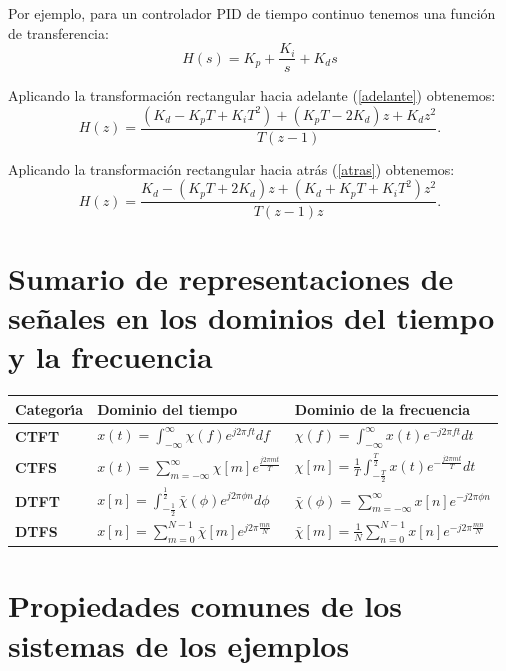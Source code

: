 Por ejemplo, para un controlador PID de tiempo continuo tenemos una funci\'{o}n de transferencia:
\begin{equation}
	H(s) = K_{p} + \frac{K_{i}}{s} + K_{d} s
\end{equation}

Aplicando la transformaci\'{o}n rectangular hacia adelante (\ref{adelante}) obtenemos:
\begin{equation}
	H(z) = \frac{(K_{d} - K_{p} T + K_{i} T^{2}) + (K_{p} T - 2 K_{d}) z + K_{d} z^2}{T (z - 1)}.
\end{equation}

Aplicando la transformaci\'{o}n rectangular hacia atr\'{a}s (\ref{atras}) obtenemos:
\begin{equation}
	H(z) = \frac{K_{d} - (K_{p} T + 2 K_{d}) z + (K_{d} + K_{p} T + K_{i} T^{2}) z^2}{T (z - 1) z}.
\end{equation}

\section{Sumario de representaciones de se\~{n}ales en los dominios del tiempo y la frecuencia}

\begin{center}
	\renewcommand{\arraystretch}{2}
	\begin{tabular}{p{2cm} p{5.5cm} p{6cm}}
		\textbf{Categor\'{\i}a} & \textbf{Dominio del tiempo} & \textbf{Dominio de la frecuencia} \\ \hline
		\textbf{CTFT} & $x(t) =\int_{-\infty }^{\infty }\chi(f) e^{j2\pi ft}df$ & $\chi(f) =\int_{-\infty }^{\infty }x(t) e^{-j2\pi ft}dt$ \\ 
		\textbf{CTFS} & $x(t) =\sum_{m=-\infty }^{\infty }\chi[m] e^{\frac{j2\pi mt}{T}}$ & $\chi[m] =\frac{1}{T}\int_{-\frac{T}{2}}^{\frac{T}{2}}x(t) e^{-\frac{j2\pi mt}{T}}dt$ \\ 
		\textbf{DTFT} & $x[n] =\int_{-\frac{1}{2}}^{\frac{1}{2}}\bar{\chi}(\phi) e^{j2\pi \phi n}d\phi $ & $\bar{\chi}(\phi) =\sum_{m=-\infty }^{\infty }x[n] e^{-j2\pi \phi n}$ \\ 
		\textbf{DTFS} & $x[n] =\sum_{m=0}^{N-1}\bar{\chi}[m] e^{j2\pi \frac{mn}{N}}$ & $\bar{\chi}[m] =\frac{1}{N}\sum_{n=0}^{N-1}x[n] e^{-j2\pi \frac{mn}{N}}$
	\end{tabular}
\end{center}

\section{Propiedades comunes de los sistemas de los ejemplos}

